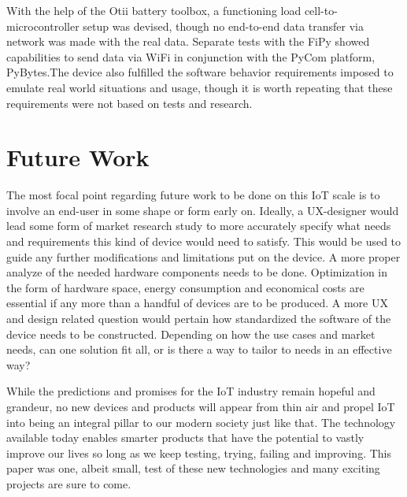 \iffalse
\begin{itemize}
	\item Critique
	\item Discussion
	\item Do not make the reader do all the work
\end{itemize}
\fi
With the help of the Otii battery toolbox, a functioning load cell-to-microcontroller setup was devised, though no end-to-end data transfer via network was made with the real data. Separate tests with the FiPy showed capabilities to send data via WiFi in conjunction with the PyCom platform, PyBytes.The device also fulfilled the software behavior requirements imposed to emulate real world situations and usage, though it is worth repeating that these requirements were not based on tests and research.

\section{Future Work}
The most focal point regarding future work to be done on this IoT scale is to involve an end-user in some shape or form early on. Ideally, a UX-designer would lead some form of market research study to more accurately specify what needs and requirements this kind of device would need to satisfy. This would be used to guide any further modifications and limitations put on the device.
A more proper analyze of the needed hardware components needs to be done. Optimization in the form of hardware space, energy consumption and economical costs are essential if any more than a handful of devices are to be produced.
A more UX and design related question would pertain how standardized the software of the device needs to be constructed. Depending on how the use cases and market needs, can one solution fit all, or is there a way to tailor to needs in an effective way?


While the predictions and promises for the IoT industry remain hopeful and grandeur, no new devices and products will appear from thin air and propel IoT into being an integral pillar to our modern society just like that. The technology available today enables smarter products that have the potential to vastly improve our lives so long as we keep testing, trying, failing and improving. This paper was one, albeit small, test of these new technologies and many exciting projects are sure to come.